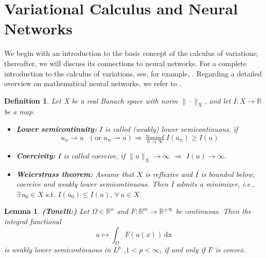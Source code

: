 \documentclass[12pt,openany]{book}
\newcommand{\R}{\mathbb{R}}
\theoremstyle{plainnormal}
\newtheorem{lemma}[theorem]{Lemma}
\newtheorem{definition}[theorem]{Definition}
\theoremstyle{remark}
\begin{document}
\section{Variational Calculus and Neural Networks}
We begin with an introduction to the basic concept of the calculus of variations; thereafter, we will discuss its connections to neural networks. For a complete introduction to the calculus of variations, see, for example, \cite{Dacorogna}. Regarding a detailed overview on mathematical neural networks, we refer to \cite{e2020mathematicalunderstandingneuralnetworkbased}.
\begin{definition}
Let X be a real Banach space with norm $\|\cdot\|_X$, and let $I: X\rightarrow\R$ be a map.
\begin{itemize}
    \item \textbf{Lower semicontinuity:} $I$ is called \emph{(weakly) lower semicontinuous}, if $$u_n \rightarrow u\text{  } (\text{or }u_n \rightharpoonup u) \Rightarrow \liminf_{n\rightarrow\infty} I(u_n)\geq I(u)$$
    \item \textbf{Coercivity:} $I$ is called \emph{coercive}, if $\|u\|_X\rightarrow \infty$ $\Rightarrow$ $ I(u) \rightarrow \infty$.
    \item \textbf{Weierstrass theorem:} Assume that $X$ is reflexive and $I$ is bounded below, coercive and weakly lower semicontinuous. Then I admits a minimizer, i.e., ~$\exists\, u_0 \in X \text{ s.t. } I(u_0) \leq I(u),\, \forall\, u \in X$.
    \label{Weierstrass}
\end{itemize}
    
\end{definition}
\begin{lemma}\label{thm:Tonelli}\textbf{(Tonelli:)}
    Let $\Omega \in \R^n$ and $F:\R^m\rightarrow\R^{\pm\infty}$ be continuous. Then the integral functional $$u \mapsto \int_\Omega F(u(x))\,\mathrm{dx}$$
    is weakly lower semicontinuous in $L^p$ ,$1<p<\infty$, if and only if $F$ is convex.
\end{lemma}
\end{document}
